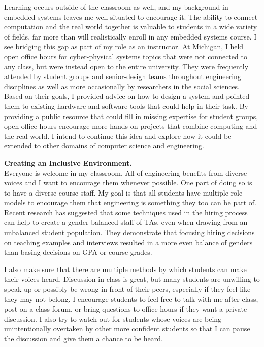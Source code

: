 \documentclass[12pt]{article} %
\begin{document}

Learning occurs outside of the classroom as well, and my background in embedded
systems leaves me well-situated to encourage it. The ability to connect
computation and the real world together is valuable to students in a wide
variety of fields, far more than will realistically enroll in any embedded
systems course. I see bridging this gap as part of my role as an instructor. At
Michigan, I held open office hours for cyber-physical systems topics that were
not connected to any class, but were instead open to the entire university.
They were frequently attended by student groups and senior-design teams
throughout engineering disciplines as well as more occasionally by researchers
in the social sciences. Based on their goals, I provided advice on how to
design a system and pointed them to existing hardware and software tools that
could help in their task. By providing a public resource that could fill in
missing expertise for student groups, open office hours encourage more hands-on
projects that combine computing and the real-world. I intend to continue this
idea and explore how it could be extended to other domains of computer science
and engineering.

\textbf{\textsf{\large Creating an Inclusive Environment.}}\\
Everyone is welcome in my classroom. All of engineering benefits from diverse
voices and I want to encourage them whenever possible. One part of doing so is
to have a diverse course staff. My goal is that all students have multiple role
models to encourage them that engineering is something they too can be part of.
Recent research has suggested that some techniques used in the hiring process
can help to create a gender-balanced staff of TAs, even when drawing from an
unbalanced student population\footnotemark. They demonstrate that focusing
hiring decisions on teaching examples and interviews resulted in a more even
balance of genders than basing decisions on GPA or course grades.


I also make sure that there are multiple methods by which students can make
their voices heard. Discussion in class is great, but many students are
unwilling to speak up or possibly be wrong in front of their peers, especially
if they feel like they may not belong. I encourage students to feel free to
talk with me after class, post on a class forum, or bring questions to office
hours if they want a private discussion. I also try to watch out for students
whose voices are being unintentionally overtaken by other more confident
students so that I can pause the discussion and give them a chance to be heard.
\end{document}
